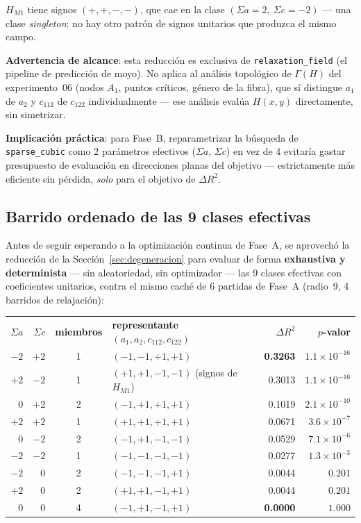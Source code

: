 \documentclass[11pt, a4paper]{article}
\newcommand{\TH}[1]{\cellcolor{cTHbg}\color{white}\textbf{#1}}
\newcommand{\good}[1]{\color{cGood}\textbf{#1}}
\newcommand{\bad}[1]{\color{cBad}\textbf{#1}}
\begin{document}
$H_{M1}$ tiene signos $(+,+,-,-)$, que cae en la clase
$(\Sigma a{=}2,\ \Sigma c{=}{-}2)$ --- una clase \emph{singleton}: no
hay otro patr\'on de signos unitarios que produzca el mismo campo.

\begin{tcolorbox}[pendingbox]
  \textbf{Advertencia de alcance}: esta reducci\'on es exclusiva de
  \texttt{relaxation\_field} (el pipeline de predicci\'on de moyo). No
  aplica al an\'alisis topol\'ogico de $\Gamma(H)$ del experimento~06
  (nodos $A_1$, puntos cr\'iticos, g\'enero de la fibra), que s\'i
  distingue $a_1$ de $a_2$ y $c_{112}$ de $c_{122}$ individualmente ---
  ese an\'alisis eval\'ua $H(x,y)$ directamente, sin simetrizar.
\end{tcolorbox}

\textbf{Implicaci\'on pr\'actica}: para Fase~B, reparametrizar la
b\'usqueda de \texttt{sparse\_cubic} como 2 par\'ametros efectivos
($\Sigma a$, $\Sigma c$) en vez de 4 evitar\'ia gastar presupuesto de
evaluaci\'on en direcciones planas del objetivo --- estrictamente m\'as
eficiente sin p\'erdida, \emph{solo} para el objetivo de $\Delta R^2$.

\subsection{Barrido ordenado de las 9 clases efectivas}
\label{sec:barrido9}

Antes de seguir esperando a la optimizaci\'on continua de Fase~A, se
aprovech\'o la reducci\'on de la Secci\'on~\ref{sec:degeneracion} para
evaluar de forma \textbf{exhaustiva y determinista} --- sin
aleatoriedad, sin optimizador --- las 9 clases efectivas con
coeficientes unitarios, contra el mismo cach\'e de 6 partidas de
Fase~A (radio~9, 4 barridos de relajaci\'on):

\medskip
\begin{center}
\begin{tabular}{rrcp{4cm}rr}
  \TH{$\Sigma a$} & \TH{$\Sigma c$} & \TH{miembros} & \TH{representante $(a_1,a_2,c_{112},c_{122})$} & \TH{$\Delta R^2$} & \TH{$p$-valor} \\[1pt]
  $-2$ & $+2$ & 1 & $(-1,-1,+1,+1)$ & \good{0.3263} & $1.1\times10^{-16}$ \\
  $+2$ & $-2$ & 1 & $(+1,+1,-1,-1)$ \small (signos de $H_{M1}$) & 0.3013 & $1.1\times10^{-16}$ \\
  $0$  & $+2$ & 2 & $(-1,+1,+1,+1)$ & 0.1019 & $2.1\times10^{-10}$ \\
  $+2$ & $+2$ & 1 & $(+1,+1,+1,+1)$ & 0.0671 & $3.6\times10^{-7}$ \\
  $0$  & $-2$ & 2 & $(-1,+1,-1,-1)$ & 0.0529 & $7.1\times10^{-6}$ \\
  $-2$ & $-2$ & 1 & $(-1,-1,-1,-1)$ & 0.0277 & $1.3\times10^{-3}$ \\
  $-2$ & $0$  & 2 & $(-1,-1,-1,+1)$ & 0.0044 & $0.201$ \\
  $+2$ & $0$  & 2 & $(+1,+1,-1,+1)$ & 0.0044 & $0.201$ \\
  $0$  & $0$  & 4 & $(-1,+1,-1,+1)$ & \bad{0.0000} & $1.000$ \\
\end{tabular}
\end{center}
\medskip
\end{document}
